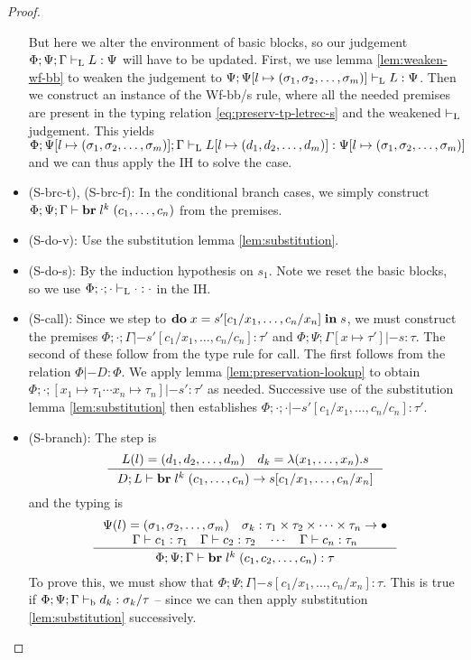 \documentclass[a4paper, oneside, 10pt, draft]{memoir}
\begin{document}
\begin{proof}
\begin{itemize}
    But here we alter the environment of basic blocks, so our
    judgement $\Phi;\Psi;\Gamma |-_{\mathrm{L}} L : \Psi$ will have to be
    updated. First, we use lemma \ref{lem:weaken-wf-bb} to weaken
    the judgement to $\Psi;\Psi[l \mapsto (\sigma_1, \sigma_2, \dotsc, \sigma_m)] |-_{\mathrm{L}} L :
    \Psi$. Then we construct an instance of the Wf-bb/s rule, where all the
    needed premises are present in the typing relation
    \eqref{eq:preserv-tp-letrec-s} and the weakened $|-_{\mathrm{L}}$
    judgement. This yields $\Phi;\Psi[l \mapsto (\sigma_1, \sigma_2, \dotsc, \sigma_m)];\Gamma
    |-_{\mathrm{L}} L[l \mapsto (d_1, d_2, \dotsc, d_m)] : \Psi[l \mapsto (\sigma_1, \sigma_2, \dotsc, \sigma_m)]$ and we
    can thus apply the IH to solve the case.
  \item (S-brc-t), (S-brc-f):
    In the conditional branch cases, we simply construct
    $\Phi;\Psi;\Gamma |- \mathbf{br} \; l^k \; (c_1, \dotsc, c_n)$ from the
    premises.
  \item (S-do-v):
    Use the substitution lemma \ref{lem:substitution}.
  \item (S-do-s):
    By the induction hypothesis on $s_1$. Note we reset the basic
    blocks, so we use $\Phi;\cdot;\cdot |-_{\mathrm{L}} \cdot : \cdot$ in the IH.
  \item (S-call): Since we step to
    $\mathbf{do} \; x = s'[c_1/x_1,\dotsc,c_n/x_n] \; \mathbf{in} \; s$, we must construct the
    premises $\Phi;\cdot;\Gamma |- s'[c_1/x_1,\dotsc,c_n/c_n] : \tau'$
    and $\Phi;\Psi;\Gamma[x \mapsto \tau'] |- s : \tau$. The second of
    these follow from the type rule for call. The first follows from
    the relation $\Phi |- D : \Phi$. We apply lemma
    \ref{lem:preservation-lookup} to obtain $\Phi;\cdot;[x_1
    \mapsto \tau_1 \dotsb x_n \mapsto \tau_n] |- s' : \tau'$ as
    needed. Successive use of the substitution lemma
    \ref{lem:substitution} then establishes $\Phi;\cdot;\cdot |-
    s'[c_1/x_1,\dotsc,c_n/c_n] : \tau'$.
  \item (S-branch):
    The step is
    \begin{equation*}
      \inference{L(l) = \dbundle \quad d_k = \lambda(x_1, \dotsc,
        x_n).s}
      {D;L |- \ibr{l^k}{(c_1, \dotsc, c_n)} -> s[c_1/x_1, \dotsc, c_n/x_n]}
    \end{equation*}
    and the typing is
    \begin{equation*}
      \inference{\Psi(l) = \bbtypes{} \quad \sigma_k :
        \ntypes -> \bullet\\
        \Gamma |- c_1 : \tau_1 \quad \Gamma |- c_2 : \tau_2 \quad \dotsb
        \quad \Gamma |- c_n : \tau_n}
      {\Phi;\Psi;\Gamma |- \ibr{l^k}(c_1, c_2, \dotsc, c_n) : \tau}
    \end{equation*}
    To prove this, we must show that $\Phi;\Psi;\Gamma |-
    s[c_1/x_1,\dotsc,c_n/x_n] : \tau$. This is true if
    $\Phi;\Psi;\Gamma |-_{\mathrm{b}} d_k : \sigma_k / \tau$ -- since we can then
    apply substitution \ref{lem:substitution} successively.


\end{itemize}
\end{proof}
\end{document}
